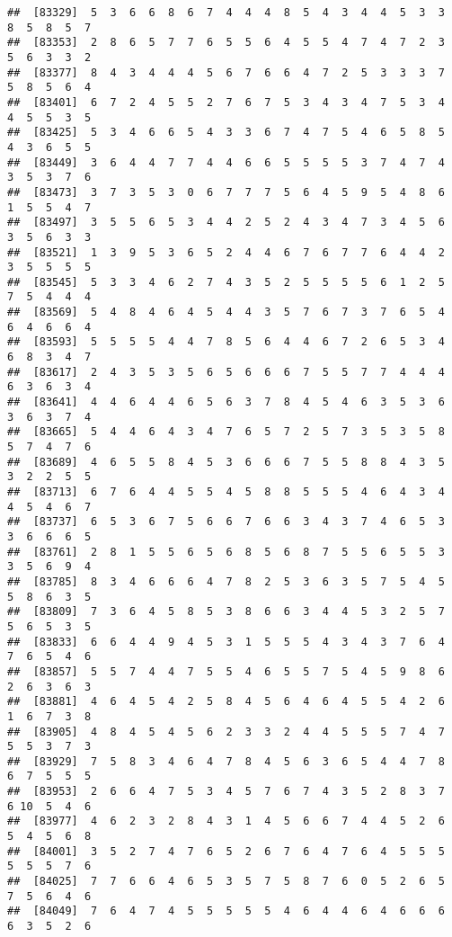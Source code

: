 \documentclass[
]{book}
\begin{document}
\begin{verbatim}
##  [83329]  5  3  6  6  8  6  7  4  4  4  8  5  4  3  4  4  5  3  3  8  5  8  5  7
##  [83353]  2  8  6  5  7  7  6  5  5  6  4  5  5  4  7  4  7  2  3  5  6  3  3  2
##  [83377]  8  4  3  4  4  4  5  6  7  6  6  4  7  2  5  3  3  3  7  5  8  5  6  4
##  [83401]  6  7  2  4  5  5  2  7  6  7  5  3  4  3  4  7  5  3  4  4  5  5  3  5
##  [83425]  5  3  4  6  6  5  4  3  3  6  7  4  7  5  4  6  5  8  5  4  3  6  5  5
##  [83449]  3  6  4  4  7  7  4  4  6  6  5  5  5  5  3  7  4  7  4  3  5  3  7  6
##  [83473]  3  7  3  5  3  0  6  7  7  7  5  6  4  5  9  5  4  8  6  1  5  5  4  7
##  [83497]  3  5  5  6  5  3  4  4  2  5  2  4  3  4  7  3  4  5  6  3  5  6  3  3
##  [83521]  1  3  9  5  3  6  5  2  4  4  6  7  6  7  7  6  4  4  2  3  5  5  5  5
##  [83545]  5  3  3  4  6  2  7  4  3  5  2  5  5  5  5  6  1  2  5  7  5  4  4  4
##  [83569]  5  4  8  4  6  4  5  4  4  3  5  7  6  7  3  7  6  5  4  6  4  6  6  4
##  [83593]  5  5  5  5  4  4  7  8  5  6  4  4  6  7  2  6  5  3  4  6  8  3  4  7
##  [83617]  2  4  3  5  3  5  6  5  6  6  6  7  5  5  7  7  4  4  4  6  3  6  3  4
##  [83641]  4  4  6  4  4  6  5  6  3  7  8  4  5  4  6  3  5  3  6  3  6  3  7  4
##  [83665]  5  4  4  6  4  3  4  7  6  5  7  2  5  7  3  5  3  5  8  5  7  4  7  6
##  [83689]  4  6  5  5  8  4  5  3  6  6  6  7  5  5  8  8  4  3  5  3  2  2  5  5
##  [83713]  6  7  6  4  4  5  5  4  5  8  8  5  5  5  4  6  4  3  4  4  5  4  6  7
##  [83737]  6  5  3  6  7  5  6  6  7  6  6  3  4  3  7  4  6  5  3  3  6  6  6  5
##  [83761]  2  8  1  5  5  6  5  6  8  5  6  8  7  5  5  6  5  5  3  3  5  6  9  4
##  [83785]  8  3  4  6  6  6  4  7  8  2  5  3  6  3  5  7  5  4  5  5  8  6  3  5
##  [83809]  7  3  6  4  5  8  5  3  8  6  6  3  4  4  5  3  2  5  7  5  6  5  3  5
##  [83833]  6  6  4  4  9  4  5  3  1  5  5  5  4  3  4  3  7  6  4  7  6  5  4  6
##  [83857]  5  5  7  4  4  7  5  5  4  6  5  5  7  5  4  5  9  8  6  2  6  3  6  3
##  [83881]  4  6  4  5  4  2  5  8  4  5  6  4  6  4  5  5  4  2  6  1  6  7  3  8
##  [83905]  4  8  4  5  4  5  6  2  3  3  2  4  4  5  5  5  7  4  7  5  5  3  7  3
##  [83929]  7  5  8  3  4  6  4  7  8  4  5  6  3  6  5  4  4  7  8  6  7  5  5  5
##  [83953]  2  6  6  4  7  5  3  4  5  7  6  7  4  3  5  2  8  3  7  6 10  5  4  6
##  [83977]  4  6  2  3  2  8  4  3  1  4  5  6  6  7  4  4  5  2  6  5  4  5  6  8
##  [84001]  3  5  2  7  4  7  6  5  2  6  7  6  4  7  6  4  5  5  5  5  5  5  7  6
##  [84025]  7  7  6  6  4  6  5  3  5  7  5  8  7  6  0  5  2  6  5  7  5  6  4  6
##  [84049]  7  6  4  7  4  5  5  5  5  5  4  6  4  4  6  4  6  6  6  6  3  5  2  6

\end{verbatim}
\end{document}
